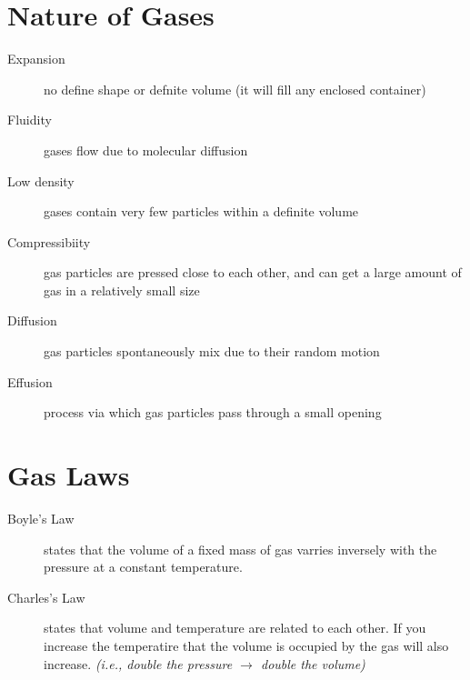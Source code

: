 \section{Nature of Gases}
\begin{description}
  \item[Expansion] no define shape or defnite volume (it will fill any enclosed
    container)
  \item[Fluidity] gases flow due to molecular diffusion
  \item[Low density] gases contain very few particles within a definite volume
  \item[Compressibiity] gas particles are pressed close to each other, and can
    get a large amount of gas in a relatively small size
  \item[Diffusion] gas particles spontaneously mix due to their random motion
  \item[Effusion] process via which gas particles pass through a small opening
\end{description}

\section{Gas Laws}
\begin{description}
  \item[Boyle's Law] states that the volume of a fixed mass of gas varries
    inversely with the pressure at a constant temperature.
  \item[Charles's Law] states that volume and temperature are related to each
    other.  If you increase the temperatire that the volume is occupied by the
    gas will also increase.  \textit{(i.e., double the pressure $\rightarrow$
    double the volume)}
\end{description}
